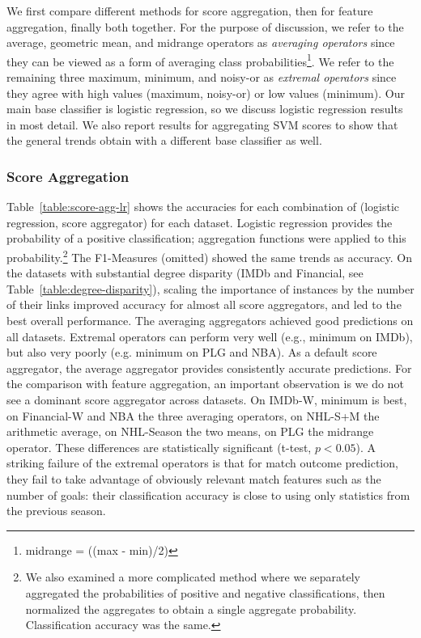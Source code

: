 \documentclass[conference]{IEEEtran}
\begin{document}
We first compare different methods for score aggregation, then for feature aggregation, finally both together. For the purpose of discussion, we refer to the average, geometric mean, and midrange operators as {\em averaging operators} since they can be viewed as a form of averaging class probabilities\footnote{midrange = ((max - min)/2)}. We refer to the remaining three maximum, minimum, and noisy-or as {\em extremal operators} since they agree with high values (maximum, noisy-or) or low values (minimum). Our main base classifier is logistic regression, so we discuss logistic regression results in most detail. We also report results for aggregating SVM scores to show that the general trends obtain with a different base classifier as well.

\subsubsection{Score Aggregation} Table~\ref{table:score-agg-lr} shows the accuracies for each combination of (logistic regression, score aggregator) for each dataset. Logistic regression provides the probability of a positive classification; aggregation functions were applied to this probability.\footnote{We also examined a more complicated method where we separately aggregated the probabilities of positive and negative classifications, then normalized the aggregates to obtain a single aggregate probability. Classification accuracy was the same.} The F1-Measures (omitted) showed the same trends as accuracy. On the datasets with substantial degree disparity (IMDb and Financial, see Table~\ref{table:degree-disparity}), scaling the importance of instances by the number of their links improved accuracy for almost all score aggregators, and led to the best overall performance. The averaging aggregators achieved good predictions on all datasets. Extremal operators can perform very well (e.g., minimum on IMDb), but also very poorly (e.g. minimum on PLG and NBA). As a default score aggregator, the average aggregator provides consistently accurate predictions. For the comparison with feature aggregation, an important observation is we do not see a dominant score aggregator across datasets. On IMDb-W, minimum is best, on Financial-W and NBA the three averaging operators, on NHL-S+M the arithmetic average, on NHL-Season the two means, on PLG the midrange operator. These differences are statistically significant (t-test, $p<0.05$). A striking failure of the extremal operators is that for match outcome prediction, they fail to take advantage of obviously relevant match features such as the number of goals: their classification accuracy is close to using only statistics from the previous season.
\end{document}
